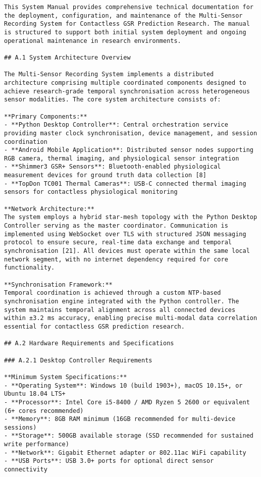 \begin{verbatim}
This System Manual provides comprehensive technical documentation for the deployment, configuration, and maintenance of the Multi-Sensor Recording System for Contactless GSR Prediction Research. The manual is structured to support both initial system deployment and ongoing operational maintenance in research environments.

## A.1 System Architecture Overview

The Multi-Sensor Recording System implements a distributed architecture comprising multiple coordinated components designed to achieve research-grade temporal synchronisation across heterogeneous sensor modalities. The core system architecture consists of:

**Primary Components:**
- **Python Desktop Controller**: Central orchestration service providing master clock synchronisation, device management, and session coordination
- **Android Mobile Application**: Distributed sensor nodes supporting RGB camera, thermal imaging, and physiological sensor integration
- **Shimmer3 GSR+ Sensors**: Bluetooth-enabled physiological measurement devices for ground truth data collection [8]
- **TopDon TC001 Thermal Cameras**: USB-C connected thermal imaging sensors for contactless physiological monitoring

**Network Architecture:**
The system employs a hybrid star-mesh topology with the Python Desktop Controller serving as the master coordinator. Communication is implemented using WebSocket over TLS with structured JSON messaging protocol to ensure secure, real-time data exchange and temporal synchronisation [21]. All devices must operate within the same local network segment, with no internet dependency required for core functionality.

**Synchronisation Framework:**
Temporal coordination is achieved through a custom NTP-based synchronisation engine integrated with the Python controller. The system maintains temporal alignment across all connected devices within ±3.2 ms accuracy, enabling precise multi-modal data correlation essential for contactless GSR prediction research.

## A.2 Hardware Requirements and Specifications

### A.2.1 Desktop Controller Requirements

**Minimum System Specifications:**
- **Operating System**: Windows 10 (build 1903+), macOS 10.15+, or Ubuntu 18.04 LTS+
- **Processor**: Intel Core i5-8400 / AMD Ryzen 5 2600 or equivalent (6+ cores recommended)
- **Memory**: 8GB RAM minimum (16GB recommended for multi-device sessions)
- **Storage**: 500GB available storage (SSD recommended for sustained write performance)
- **Network**: Gigabit Ethernet adapter or 802.11ac WiFi capability
- **USB Ports**: USB 3.0+ ports for optional direct sensor connectivity


\end{verbatim}
